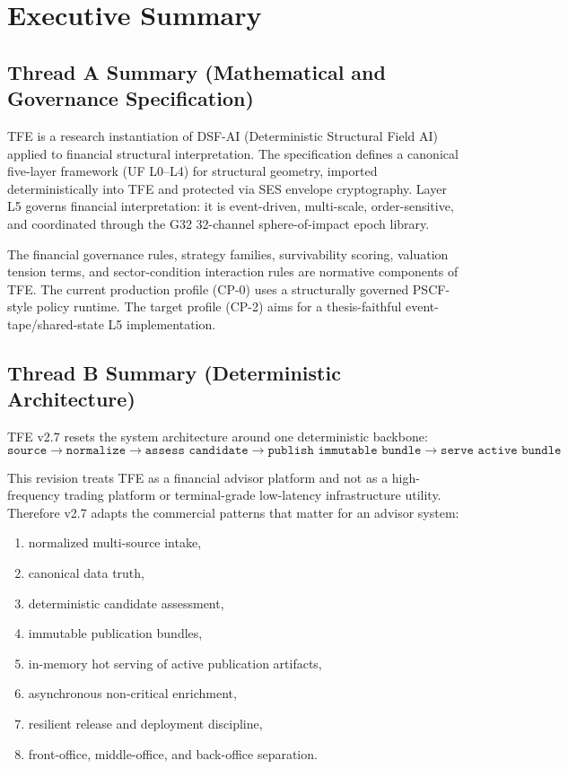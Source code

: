 \documentclass[11pt]{report}
\begin{document}
\tableofcontents
\clearpage

\chapter*{Executive Summary}

\section*{Thread A Summary (Mathematical and Governance Specification)}
TFE is a research instantiation of DSF-AI (Deterministic Structural Field AI) applied to financial structural interpretation. The specification defines a canonical five-layer framework (UF L0--L4) for structural geometry, imported deterministically into TFE and protected via SES envelope cryptography. Layer L5 governs financial interpretation: it is event-driven, multi-scale, order-sensitive, and coordinated through the G32 32-channel sphere-of-impact epoch library.

The financial governance rules, strategy families, survivability scoring, valuation tension terms, and sector-condition interaction rules are normative components of TFE. The current production profile (CP-0) uses a structurally governed PSCF-style policy runtime. The target profile (CP-2) aims for a thesis-faithful event-tape/shared-state L5 implementation.

\section*{Thread B Summary (Deterministic Architecture)}
TFE v2.7 resets the system architecture around one deterministic backbone:
\[
\texttt{source} \rightarrow \texttt{normalize} \rightarrow \texttt{assess candidate} \rightarrow \texttt{publish immutable bundle} \rightarrow \texttt{serve active bundle}
\]

This revision treats TFE as a financial advisor platform and not as a high-frequency trading platform or terminal-grade low-latency infrastructure utility. Therefore v2.7 adapts the commercial patterns that matter for an advisor system:
\begin{enumerate}[leftmargin=1.2cm]
    \item normalized multi-source intake,
    \item canonical data truth,
    \item deterministic candidate assessment,
    \item immutable publication bundles,
    \item in-memory hot serving of active publication artifacts,
    \item asynchronous non-critical enrichment,
    \item resilient release and deployment discipline,
    \item front-office, middle-office, and back-office separation.
\end{enumerate}
\end{document}
